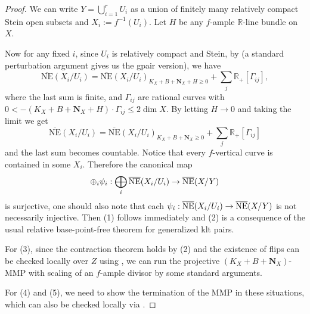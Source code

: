 \documentclass[11pt]{amsart}
\numberwithin{equation}{section}
\def\dim{\operatorname{dim}}
\newcommand\R{{\mathbb{R}}}
\theoremstyle{definition}
\theoremstyle{definition}
\theoremstyle{definition}
\begin{document}
\begin{proof}
We can write $Y=\bigcup_{i=1}^r U_i$ as a union of finitely many relatively compact Stein open subsets and $X_i:=f^{-1}\left(U_i\right)$. Let $H$ be any $f$-ample $\R$-line bundle on $X$. 

Now for any fixed $i$, since $U_i$ is relatively compact and Stein, by \cite[Theorem 7.2]{Fuj22} (a standard perturbation argument gives us the gpair version), we have
\[
\overline{\mathrm{NE}}\left(X_i / U_i\right)=\overline{\mathrm{NE}}\left(X_i / U_i\right)_{K_X+B+\mathbf N_X+H\geq 0} + \sum_j \mathbb{R}_+ [\Gamma_{ij}],
\] where the last sum is finite, and $\Gamma_{ij}$ are rational curves with $0<-(K_X+B+\mathbf N_X+H)\cdot \Gamma_{ij}\leq 2\dim X$. By letting $H\to 0$ and taking the limit we get
$$
\overline{\mathrm{NE}}\left(X_i / U_i\right)
=
\overline{\mathrm{NE}}\left(X_i / U_i\right)_{K_X+B+\mathbf N_X\geq 0}
+
\sum_j \mathbb{R}_+ [\Gamma_{ij}]
$$
and the last sum becomes countable. Notice that every $f$-vertical curve is contained in some $X_i$. Therefore the canonical map
\[
\oplus_{i}\psi_i: \bigoplus_i\overline{\mathrm{NE}}(X_i / U_i) \to \overline{\rm NE}(X/Y)
\]
is surjective, one should also note that each $\psi_i: \overline{\mathrm{NE}}(X_i / U_i) \to \overline{\rm NE}(X/Y)$ is not necessarily injective. Then (1) follows immediately and (2) is a consequence of the usual relative base-point-free theorem for generalized klt pairs.

For (3), since the contraction theorem holds by (2) and the existence of flips can be checked locally over $Z$ using \cite{Fuj22}, we can run the projective $(K_X+B+\mathbf N_X)$-MMP with scaling of an $f$-ample divisor by some standard arguments.

For (4) and (5), we need to show the termination of the MMP in these situations, which can also be checked locally via \cite{Fuj22}.
\end{proof}



\end{document}
